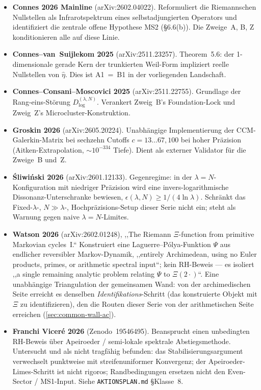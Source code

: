 \documentclass[12pt,a4paper]{article}
\theoremstyle{definition}
\theoremstyle{remark}
\begin{document}
\begin{itemize}
  \item \textbf{Connes 2026 Mainline} \cite{Connes2026}
    (arXiv:2602.04022). Reformuliert die Riemannschen Nullstellen als
    Infrarotspektrum eines selbstadjungierten Operators und identifiziert
    die zentrale offene Hypothese MS2 (\S6.6(b)). Die Zweige~A, B, Z
    konditionieren alle auf diese Linie.

  \item \textbf{Connes--van~Suijlekom 2025} \cite{ConnesvS2025}
    (arXiv:2511.23257). Theorem~5.6: der 1-dimensionale gerade Kern der
    trunkierten Weil-Form impliziert reelle Nullstellen von $\hat\eta$.
    Dies ist A1~=~B1 in der vorliegenden Landschaft.

  \item \textbf{Connes--Consani--Moscovici 2025}
    \cite{ConnesMoscovici2023} (arXiv:2511.22755). Grundlage der
    Rang-eins-Störung $D^{(\lambda,N)}_{\log}$. Verankert Zweig~B's
    Foundation-Lock und Zweig~Z's Microcluster-Konstruktion.

  \item \textbf{Groskin 2026} (arXiv:2605.20224). Unabhängige
    Implementierung der CCM-Galerkin-Matrix bei sechzehn Cutoffs
    $c=13\ldots 67, 100$ bei hoher Präzision (Aitken-Extrapolation,
    $\sim 10^{-334}$ Tiefe). Dient als externer Validator für die
    Zweige~B und~Z.

  \item \textbf{\'Sliwi\'nski 2026} (arXiv:2601.12133). Gegenregime:
    in der $\lambda = N$-Konfiguration mit niedriger Präzision wird eine
    invers-logarithmische Dissonanz-Unterschranke bewiesen,
    $\epsilon(\lambda,N)\ge 1/(4\ln\lambda)$. Schränkt das
    Fixed-$\lambda$-, $N\gg\lambda$-, Hochpräzisions-Setup dieser
    Serie nicht ein; steht als Warnung gegen naive $\lambda = N$-Limites.

  \item \textbf{Watson 2026} (arXiv:2602.01248), ,,The Riemann $\Xi$-function from
    primitive Markovian cycles~I.`` Konstruiert eine Laguerre--P\'olya-Funktion
    $\Psi$ aus endlicher reversibler Markov-Dynamik, ,,entirely Archimedean, using
    no Euler products, primes, or arithmetic spectral input``; kein RH-Beweis --- es
    isoliert ,,a single remaining analytic problem relating $\Psi$ to
    $\Xi(2\cdot)$``. Eine unabhängige Triangulation der gemeinsamen Wand: von der
    archimedischen Seite erreicht es denselben \emph{Identifikations}-Schritt (das
    konstruierte Objekt mit $\Xi$ zu identifizieren), den die Routen dieser Serie
    von der arithmetischen Seite erreichen (\cref{sec:common-wall-ac}).

  \item \textbf{Franchi Vicer\'e 2026} (Zenodo~19546495). Beansprucht
    einen unbedingten RH-Beweis über Apeiroeder / semi-lokale spektrale
    Abstiegsmethode. Untersucht und als nicht tragfähig befunden: das
    Stabilisierungsargument verwechselt punktweise mit
    streifenuniformer Konvergenz; der Apeiroeder-Limes-Schritt ist nicht
    rigoros; Randbedingungen ersetzen nicht den Even-Sector / MS1-Input.
    Siehe \texttt{AKTIONSPLAN.md} \S Klasse~8.
\end{itemize}
\end{document}
